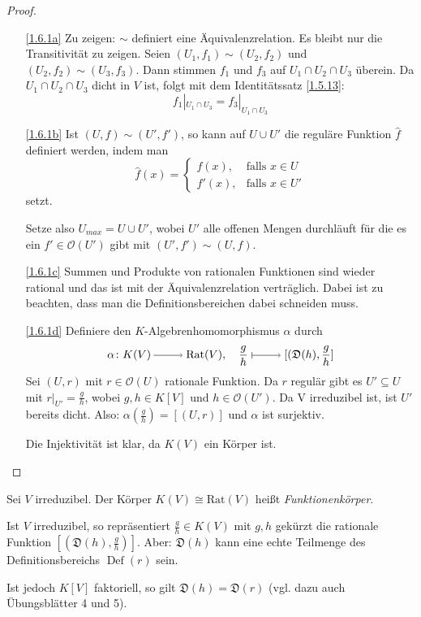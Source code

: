 \documentclass[a4paper,12pt]{scrbook}
\theoremstyle{keinenummern} %
\theoremstyle{mitnummern}
\theoremstyle{unserbeweis}
\newtheorem{proof}{Beweis}
\def\O{\mathcal{O}}
\newcommand{\D}{\mathfrak{D}}
\newcommand{\Rat}{\mathrm{Rat}}
\newcommand{\Def}{\operatorname{Def}}
\newcommand{\restrict}[1]{|_{#1}}
\newcommand{\ra}{\raisebox{-1pt}{\tikz{\draw[thin,shorten >=3pt, ->] (0,0) node{\hspace*{-2pt}} -- node{} (1,0);}}\penalty1000\relax}
\renewcommand{\mapsto}{\raisebox{-1pt}{\tikz{\draw[thin,shorten >=3pt, |->] (0,0) node{\hspace*{0pt}} -- node{} (1,0);}}\penalty1000\relax}
\newcommand{\dach}{\widehat}
\begin{document}
\begin{proof}
\begin{enumerate}
\item[\ref{1.6.1a}] Zu zeigen: $\sim$ definiert eine Äquivalenzrelation. Es bleibt nur die Transitivität zu zeigen.
Seien $(U_1,f_1)\sim (U_2,f_2)$ und $(U_2,f_2)\sim (U_3,f_3)$. Dann stimmen $f_1$ und $f_3$ auf $U_1\cap U_2\cap U_3$ überein. Da $U_1\cap U_2\cap U_3$ dicht in $V$ ist, folgt mit dem Identitätssatz \cref{1.5.13}:
\[f_1\restrict{U_1\cap U_3}=f_3\restrict{U_1\cap U_3}\]
\item[\ref{1.6.1b}] Ist $(U,f)\sim(U',f')$, so kann auf $U\cup U'$ die reguläre Funktion $\dach{f}$ definiert werden, indem man 
\[\dach{f}(x)=\begin{cases} f(x),&\text{falls } x\in U \\ f'(x),&\text{falls } x\in U'\end{cases}\] setzt.

Setze also $U_{max}=U\cup U'$, wobei $U'$ alle offenen Mengen durchläuft für die es ein $f'\in \O(U')$ gibt mit $(U',f')\sim (U,f)$.
\item[\ref{1.6.1c}] Summen und Produkte von rationalen Funktionen sind wieder rational und das ist mit der Äquivalenzrelation verträglich. Dabei ist zu beachten, dass man die Definitionsbereichen dabei schneiden muss.
\item[\ref{1.6.1d}] Definiere den $K$-Algebrenhomomorphismus $\alpha$ durch
\[\alpha\colon K(V)\ra \Rat(V), \quad \frac{g}{h}\mapsto [(\D(h),\frac{g}{h}]\] 
Sei $(U,r)$ mit $r\in \O(U)$ rationale Funktion. Da $r$ regulär gibt es $U'\subseteq U$ mit $r\restrict{U'}=\frac{g}{h}$, wobei $g,h \in K[V]$ und $h\in \O(U')$. Da V irreduzibel ist, ist $U'$ bereits dicht. Also: $\alpha(\frac{g}{h})=[(U,r)]$ und $\alpha$ ist surjektiv.

Die Injektivität ist klar, da $K(V)$ ein Körper ist.
\end{enumerate}
\end{proof}

\begin{dfn}\label{1.6.2}
Sei $V$ irreduzibel. Der Körper $K(V)\cong \Rat(V)$ heißt \emph{Funktionenkörper}.
\end{dfn}

\begin{w}
Ist $V$ irreduzibel, so repräsentiert $\frac{g}{h} \in K(V)$ mit $g,h$ gekürzt die rationale Funktion $[(\D(h),\frac{g}{h})]$.
%
Aber: $\D(h)$ kann eine echte Teilmenge des Definitionsbereichs $\Def(r)$ sein. 

Ist jedoch $K[V]$ faktoriell, so gilt $\D(h)=\D(r)$ (vgl. dazu auch Übungsblätter 4 und 5).
\end{w}
\end{document}
